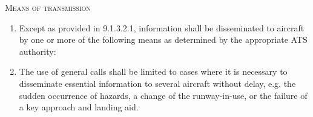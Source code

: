 \begin{enumeratesc}
    \item \textsc{Means of transmission}
    \begin{enumerate}
        \item Except as provided in 9.1.3.2.1, information shall be disseminated to aircraft by one or more of the following means as determined by the appropriate ATS authority:

        \item The use of general calls shall be limited to cases where it is necessary to disseminate essential information to several aircraft without delay, e.g. the sudden occurrence of hazards, a change of the runway-in-use, or the failure of a key approach and landing aid.
    \end{enumerate}
\end{enumeratesc}